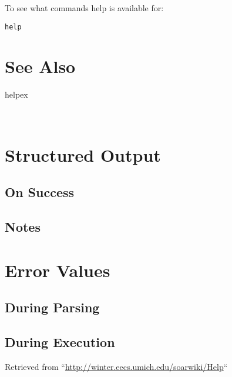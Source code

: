 \documentclass[10pt]{article}
\begin{document}
 To see what commands help is available for: \begin{verbatim}
help

\end{verbatim}

\section*{ See Also }
\begin{description}
helpex

\end{description}


 \\ 

\section*{ Structured Output }
\subsection*{ On Success }
\subsection*{ Notes }
\section*{ Error Values }
\subsection*{ During Parsing }
\subsection*{ During Execution }
 Retrieved from ``\url{http://winter.eecs.umich.edu/soarwiki/Help}``
\end{document}
